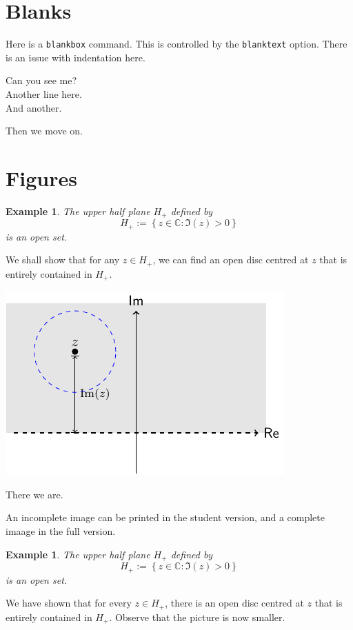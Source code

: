 \documentclass{article}
\theoremstyle{break}
\newcounter{theorem}
\newtheorem{example}[theorem]{Example}
\begin{document}
\section{Blanks}
Here is a {\tt blankbox} command. This is controlled by the {\tt blanktext} option. There is an issue with indentation here.
\begin{blankbox}
Can you see me?\\ Another line here.\\ And another.
\end{blankbox}

Then we move on.

\section{Figures}

\begin{example}
The upper half plane $H_+$ defined by
\[
H_+:= \left\{ z \in \mathbb{C}: \Im (z) > 0\right\}
\]
is an open set.
\end{example}

\begin{solution}
We shall show that for any $z \in H_+$, we can find an open disc centred at $z$ that is entirely contained in $H_+$.
\begin{center}
\includegraphics[scale=1]{upperhalf_full.pdf}
\end{center}
There we are.
\end{solution}

An incomplete image can be printed in the student version, and a complete imaage in the full version.
\begin{example}
\label{e:upperhalfplane2}
The upper half plane $H_+$ defined by
\[
H_+:= \left\{z \in \mathbb{C}: \Im (z) > 0 \right\}
\]
is an open set.
\end{example}
\begin{solution}
\begin{center}
\end{center}
We have shown that for every $z \in H_+$, there is an open disc centred at $z$ that is entirely contained in $H_+$.  Observe that the picture is now smaller.
\end{solution}
\end{document}
